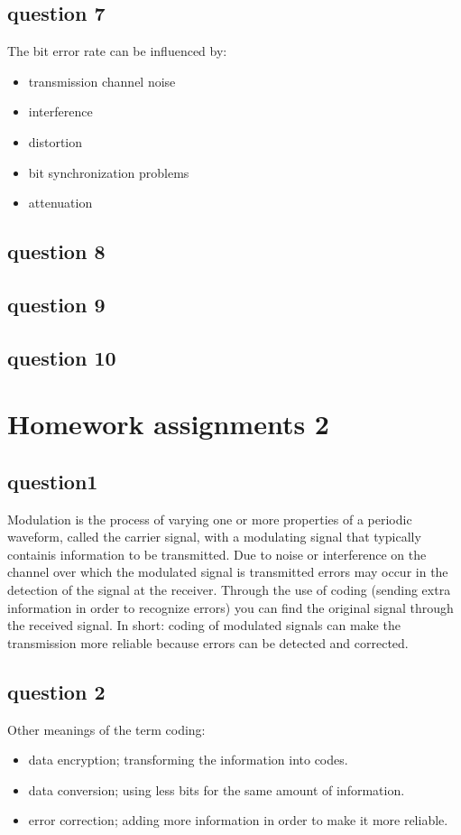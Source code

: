 \documentclass[final]{scrreprt} %
\begin{document}
\section{question 7}
The bit error rate can be influenced by:
\begin{itemize}
\item transmission channel noise
\item interference
\item distortion
\item bit synchronization problems
\item attenuation
\end{itemize}
\section{question 8}
\section{question 9}
\section{question 10}


\chapter{Homework assignments 2}
\section{question1}
Modulation is the process of varying one or more properties of a periodic waveform, called the carrier signal, with a modulating signal that typically containis information to be transmitted.
Due to noise or interference on the channel over which the modulated signal is transmitted errors may occur in the detection of the signal at the receiver. Through the use of coding (sending extra information in order to recognize errors) you can find the original signal through the received signal. 
In short: coding of modulated signals can make the transmission more reliable because errors can be detected and corrected. 
\section{question 2}
Other meanings of the term coding:
\begin{itemize}
\item data encryption; transforming the information into codes.
\item data conversion;  using less bits for the same amount of information.
\item error correction; adding more information in order to make it more reliable.
\end{itemize}
\end{document}
